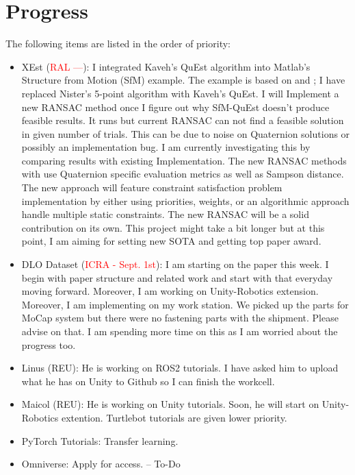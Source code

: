\documentclass[11pt]{article}
\begin{document}
\section{Progress}
The following items are listed in the order of priority:
\begin{itemize}
    \item XEst (\textcolor{red}{RAL ---}): I integrated Kaveh's QuEst algorithm
    into Matlab's Structure from Motion (SfM) example. The example is based on
    \cite{nister2004efficient} and \cite{torr2000mlesac}; I have replaced Nister's
    5-point algorithm with Kaveh's QuEst. I will Implement a new RANSAC method
    once I figure out why SfM-QuEst doesn't produce feasible results.
    It runs but current RANSAC \cite{torr2000mlesac} can
    not find a feasible solution in given number of trials. This can be due to
    noise on Quaternion solutions or possibly an implementation bug. I am
    currently investigating this by comparing results with existing
    Implementation.
    The new RANSAC methods with use Quaternion specific evaluation metrics as
    well as Sampson distance. The new approach will feature constraint
    satisfaction problem implementation by either using priorities, weights, or
    an algorithmic approach handle multiple static constraints. The new RANSAC
    will be a solid contribution on its own. This project might take a bit
    longer but at this point, I am aiming for setting new SOTA and getting
    top paper award.

    \item DLO Dataset (\textcolor{red}{ICRA - Sept. 1st}): I am starting on the paper this week. I begin with paper
    structure and related work and start with that everyday moving forward. Moreover,
    I am working on Unity-Robotics extension. Moreover, I am implementing
    \cite{zhang2021robots} on my work station. We picked up the parts for MoCap
    system but there were no fastening parts with the shipment. Please advise
    on that. I am spending more time on this as I am worried about the progress
    too.

    \item Linus (REU): He is working on ROS2 tutorials. I have asked him to
    upload what he has on Unity to Github so I can finish the workcell.
    \item Maicol (REU): He is working on Unity tutorials. Soon, he will start
    on Unity-Robotics extention. Turtlebot tutorials are given lower priority.

    \item PyTorch Tutorials: Transfer learning.
    \item Omniverse: Apply for access. -- To-Do

  \end{itemize}


\newpage

\newpage


\end{document}

